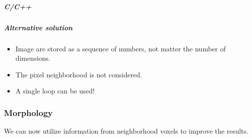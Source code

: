 \documentclass[letterpaper,10pt,english]{sphinxmanual}
\begin{document}
\subparagraph{C/C++}
\label{\detokenize{04-BasicSegmentation_Part2:c-c}}
\begin{sphinxVerbatim}[commandchars=\\\{\}]
      

 
   
      
       
      \PYG{p}{[}\PYG{p}{]}\PYG{p}{[}\PYG{p}{]}
\end{sphinxVerbatim}


\subparagraph{Alternative solution}
\label{\detokenize{04-BasicSegmentation_Part2:alternative-solution}}\begin{itemize}
\item {} 
\sphinxAtStartPar
Image are stored as a sequence of numbers, not matter the number of dimensions.

\item {} 
\sphinxAtStartPar
The pixel neighborhood is not considered.

\item {} 
\sphinxAtStartPar
A single loop can be used!

\end{itemize}


\subsubsection{Morphology}
\label{\detokenize{04-BasicSegmentation_Part2:morphology}}
\sphinxAtStartPar
We can now utilize information from neighborhood voxels to improve the results.
\end{document}
